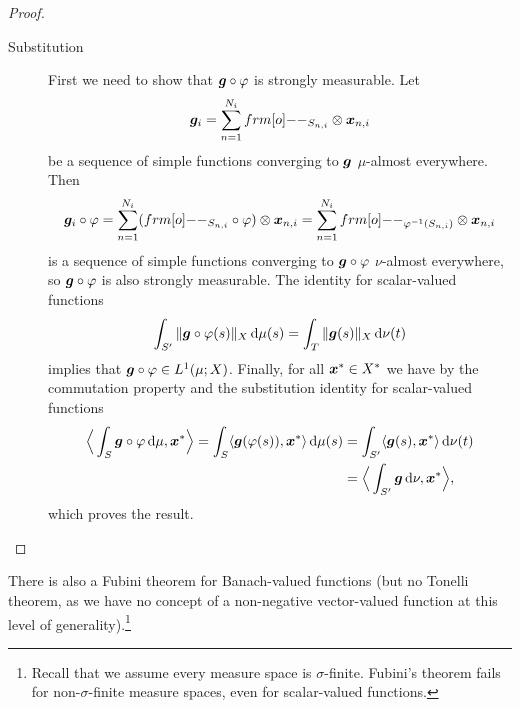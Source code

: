 \begin{proof}
\begin{description}
  \item[Substitution]
    First we need to show that $\bm{g} \circ \varphi$ is strongly measurable.
    Let
    \begin{equation*}
      \mb{g}_i = \sum_{n=1}^{N_i} \1_{S_{n,i}} \otimes \mb{x}_{n,i}
    \end{equation*}
    be a sequence of simple functions converging to $\bm{g}$ $\mu$-almost everywhere.
    Then
    \begin{equation*}
      \mb{g}_i \circ \phi = \sum_{n=1}^{N_i} (\1_{S_{n,i}} \circ \phi) \otimes \mb{x}_{n,i} = \sum_{n=1}^{N_i} \1_{\phi^{-1}(S_{n,i})} \otimes \mb{x}_{n,i}
    \end{equation*}
    is a sequence of simple functions converging to $\bm{g} \circ \varphi$ $\nu$-almost everywhere, so $\bm{g} \circ \varphi$ is also strongly measurable.
    The identity for scalar-valued functions
    \begin{equation*}
      \int_{S'} \|\bm{g} \circ \varphi(s)\|_X \, \mathrm{d}\mu(s) = \int_T \|\bm{g}(s)\|_X \, \mathrm{d}\nu(t)
    \end{equation*}
    implies that $\bm{g} \circ \varphi \in L^1(\mu;X)$.
    Finally, for all $\bm{x}^* \in X^*$ we have by the commutation property and the substitution identity for scalar-valued functions
    \begin{equation*}
      \begin{aligned}
        \Big\langle \int_S \bm{g} \circ \varphi \, \mathrm{d}\mu , \bm{x}^* \Big\rangle
        = \int_S \langle \bm{g}(\varphi(s)), \bm{x}^* \rangle \, \mathrm{d}\mu(s)
        &= \int_{S'} \langle \bm{g}(s), \bm{x}^* \rangle \, \mathrm{d}\nu(t) \\
        &= \Big\langle \int_{S'} \bm{g} \, \mathrm{d}\nu, \bm{x}^* \Big\rangle,
      \end{aligned}
    \end{equation*}
    which proves the result.
  \end{description}
\end{proof}

There is also a Fubini theorem for Banach-valued functions (but no Tonelli theorem, as we have no concept of a non-negative vector-valued function at this level of generality).\footnote{Recall that we assume every measure space is $\sigma$-finite. Fubini's theorem fails for non-$\sigma$-finite measure spaces, even for scalar-valued functions.}

